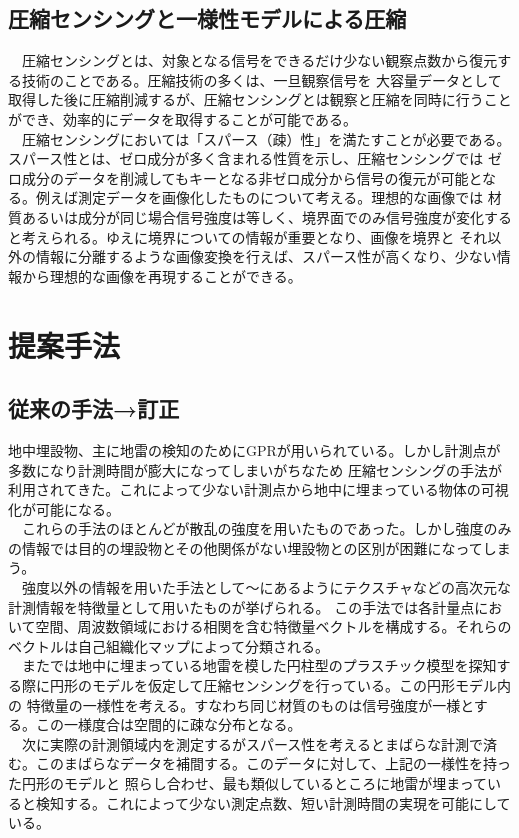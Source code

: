 \documentclass[a4paper,12pt]{jsreport}
\begin{document}
 \section{圧縮センシングと一様性モデルによる圧縮}
　圧縮センシングとは、対象となる信号をできるだけ少ない観察点数から復元する技術のことである。圧縮技術の多くは、一旦観察信号を
大容量データとして取得した後に圧縮削減するが、圧縮センシングとは観察と圧縮を同時に行うことができ、効率的にデータを取得することが可能である。
\\　圧縮センシングにおいては「スパース（疎）性」を満たすことが必要である。スパース性とは、ゼロ成分が多く含まれる性質を示し、圧縮センシングでは
ゼロ成分のデータを削減してもキーとなる非ゼロ成分から信号の復元が可能となる。例えば測定データを画像化したものについて考える。理想的な画像では
材質あるいは成分が同じ場合信号強度は等しく、境界面でのみ信号強度が変化すると考えられる。ゆえに境界についての情報が重要となり、画像を境界と
それ以外の情報に分離するような画像変換を行えば、スパース性が高くなり、少ない情報から理想的な画像を再現することができる。


\chapter{提案手法}
\section{従来の手法→訂正}
地中埋設物、主に地雷の検知のためにGPRが用いられている。しかし計測点が多数になり計測時間が膨大になってしまいがちなため
圧縮センシングの手法が利用されてきた。これによって少ない計測点から地中に埋まっている物体の可視化が可能になる。
\\　これらの手法のほとんどが散乱の強度を用いたものであった。しかし強度のみの情報では目的の埋設物とその他関係がない埋設物との区別が困難になってしまう。
\\　強度以外の情報を用いた手法として\cite{hirose1}～\cite{hirose3}にあるようにテクスチャなどの高次元な計測情報を特徴量として用いたものが挙げられる。
この手法では各計量点において空間、周波数領域における相関を含む特徴量ベクトルを構成する。それらのベクトルは自己組織化マップによって分類される。
\\　また\cite{imai}では地中に埋まっている地雷を模した円柱型のプラスチック模型を探知する際に円形のモデルを仮定して圧縮センシングを行っている。この円形モデル内の
特徴量の一様性を考える。すなわち同じ材質のものは信号強度が一様とする。この一様度合は空間的に疎な分布となる。
\\　次に実際の計測領域内を測定するがスパース性を考えるとまばらな計測で済む。このまばらなデータを補間する。このデータに対して、上記の一様性を持った円形のモデルと
照らし合わせ、最も類似しているところに地雷が埋まっていると検知する。これによって少ない測定点数、短い計測時間の実現を可能にしている。
\end{document}
